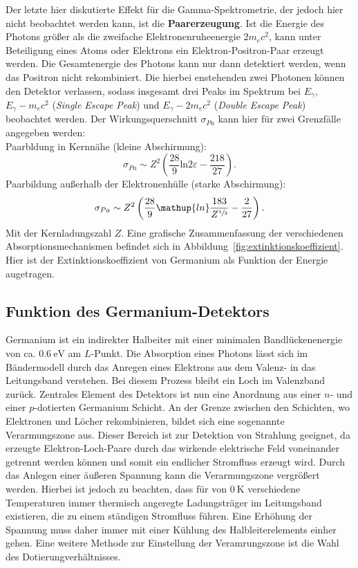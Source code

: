 Der letzte hier diskutierte Effekt für die Gamma-Spektrometrie, der jedoch hier nicht beobachtet werden kann, ist die
\textbf{Paarerzeugung}. Ist die Energie des Photons größer als die zweifache Elektronenruheenergie $2m_ec^2$,
kann unter Beteiligung eines Atoms oder Elektrons ein Elektron-Positron-Paar erzeugt werden. Die Gesamtenergie
des Photons kann nur dann detektiert werden, wenn das Positron nicht rekombiniert. Die hierbei enstehenden
zwei Photonen können den Detektor verlassen, sodass insgesamt drei Peaks im Spektrum bei $E_\gamma$, $E_\gamma - m_ec^2$ (\emph{Single Escape Peak})
und $E_\gamma - 2m_ec^2$ (\emph{Double Escape Peak}) beobachtet werden.
Der Wirkungsquerschnitt $\sigma_{Pa}$ kann hier für zwei Grenzfälle angegeben werden: \\
Paarbldung in Kernnähe (kleine Abschirmung):
\begin{equation}
    \sigma_{Pa} \sim Z^2\left(\frac{28}{9} \mathup{ln}2\varepsilon - \frac{218}{27} \right).
\end{equation}
Paarbildung außerhalb der Elektronenhülle (starke Abschirmung):
\begin{equation}
    \sigma_{Pa} \sim Z^2 \left(\frac{28}{9}\mathup{ln}\frac{183}{Z^{\sfrac{1}{3}}} - \frac{2}{27} \right).
\end{equation}
Mit der Kernladungszahl $Z$. Eine grafische Zusammenfassung der verschiedenen
Absorptionsmechanismen befindet sich in Abbildung~\ref{fig:extinktionskoeffizient}. Hier ist der Extinktionskoeffizient
von Germanium als Funktion der Energie augetragen.


\subsection{Funktion des Germanium-Detektors}
Germanium ist ein indirekter Halbeiter mit einer minimalen Bandlückenenergie von ca. $\SI{0.6}{\electronvolt}$ am $L$-Punkt.
Die Absorption eines Photons lässt sich im Bändermodell durch das Anregen eines Elektrons aus dem Valenz- in das
Leitungsband verstehen. Bei diesem Prozess bleibt ein Loch im Valenzband zurück. Zentrales Element des Detektors ist nun
eine Anordnung aus einer $n$- und einer $p$-dotierten Germanium Schicht. An der Grenze zwischen den Schichten, wo Elektronen
und Löcher rekombinieren, bildet sich eine sogenannte Verarmungszone aus. Dieser Bereich ist zur Detektion von Strahlung
geeignet, da erzeugte Elektron-Loch-Paare durch das wirkende elektrische Feld voneinander getrennt werden können und somit ein
endlicher Stromfluss erzeugt wird. Durch das Anlegen einer äußeren Spannung kann die Verarmungszone vergrößert werden. Hierbei ist jedoch
zu beachten, dass für von $\SI{0}{\kelvin}$ verschiedene Temperaturen immer thermisch angeregte Ladungsträger im Leitungsband existieren, die
zu einem ständigen Stromfluss führen. Eine Erhöhung der Spannung muss daher immer mit einer Kühlung des
Halbleiterelements einher gehen. Eine weitere Methode zur Einstellung der Veramrungszone ist die Wahl des Dotierungverhältnisses.

